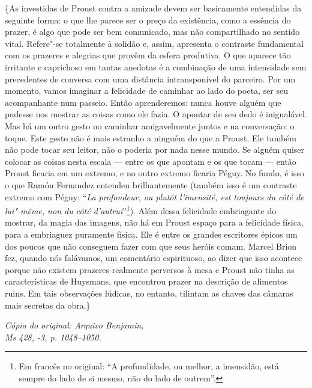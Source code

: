 \{As investidas de Proust contra a amizade devem ser basicamente entendidas
da seguinte forma: o que lhe parece ser o preço da existência, como a
essência do prazer, é algo que pode ser bem comunicado, mas não
compartilhado no sentido vital. Refere"-se totalmente à solidão e, assim,
apresenta o contraste fundamental com os prazeres e alegrias que provêm
da esfera produtiva. O que aparece tão irritante e caprichoso em tantas
anedotas é a combinação de uma intensidade sem precedentes de conversa
com uma distância intransponível do parceiro. Por um momento, vamos
imaginar a felicidade de caminhar ao lado do poeta, ser seu acompanhante
num passeio. Então aprenderemos: nunca houve alguém que pudesse nos
mostrar as coisas como ele fazia. O apontar de seu dedo é inigualável. Mas
há um outro gesto no caminhar amigavelmente juntos e na conversação: o toque. Este
gesto não é mais estranho a ninguém do que a Proust. Ele também não pode
tocar seu leitor, não o poderia por nada nesse mundo. Se alguém quiser
colocar as coisas nesta escala --- entre os que apontam e os que
tocam --- então Proust ficaria em um extremo, e no outro extremo ficaria
Péguy. No fundo, é isso o que Ramón Fernandez entendeu brilhantemente
(também isso é um contraste extremo com Péguy: ``\emph{La profondeur, ou
plutôt l'imensité, est toujours du côté de lui"-même, non du côté
d'autrui}''\footnote{Em francês no original: ``A profundidade, ou melhor, a imensidão,
  está sempre do lado de si mesmo, não do lado de outrem''. \versal{[N.~T.]}}). Além
dessa felicidade embriagante do mostrar, da magia das imagens, não há em
Proust espaço para a felicidade física, para a embriaguez puramente
física. Ele é entre os grandes escritores épicos um dos poucos que não
conseguem fazer com que seus heróis comam. Marcel Brion fez, quando nós
falávamos, um comentário espirituoso, ao dizer que isso acontece porque não
existem prazeres realmente perversos à mesa e Proust não tinha as
características de Huysmans, que encontrou prazer na descrição de
alimentos ruins. Em tais observações lúdicas, no entanto, tilintam as
chaves das câmaras mais secretas da obra.\}

\begin{flushright}
\emph{\footnotesize{Cópia do original: Arquivo Benjamin,\\ Ms 428, -3, p. 1048--1050.}}
\end{flushright}

